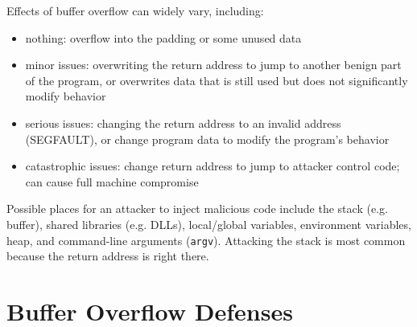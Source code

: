 \documentclass[code]{amznotes}
\begin{document}
Effects of buffer overflow can widely vary, including:
\begin{itemize}
    \item nothing: overflow into the padding or some unused data
    \item minor issues: overwriting the return address to jump to another benign part of the program, or overwrites data that is still used but does not significantly modify behavior
    \item serious issues: changing the return address to an invalid address (SEGFAULT), or change program data to modify the program's behavior
    \item catastrophic issues: change return address to jump to attacker control code; can cause full machine compromise
\end{itemize}

Possible places for an attacker to inject malicious code include the stack (e.g. buffer), shared libraries (e.g. DLLs), local/global variables, environment variables, heap, and command-line arguments (\texttt{argv}). Attacking the stack is most common because the return address is right there.

\section{Buffer Overflow Defenses}
\end{document}
